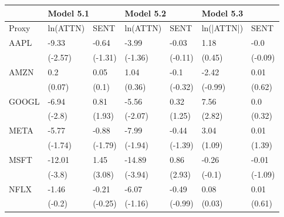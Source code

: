 \begin{tabular}{lllllll}
\toprule
{} & \multicolumn{2}{l}{Model 5.1} & \multicolumn{2}{l}{Model 5.2} & \multicolumn{2}{l}{Model 5.3} \\
\midrule
Proxy &  ln(ATTN) &     SENT &  ln(ATTN) &     SENT &  ln(|ATTN|) &     SENT \\
AAPL  &     -9.33 &    -0.64 &     -3.99 &    -0.03 &        1.18 &     -0.0 \\
      &   (-2.57) &  (-1.31) &   (-1.36) &  (-0.11) &      (0.45) &  (-0.09) \\
AMZN  &       0.2 &     0.05 &      1.04 &     -0.1 &       -2.42 &     0.01 \\
      &    (0.07) &    (0.1) &    (0.36) &  (-0.32) &     (-0.99) &   (0.62) \\
GOOGL &     -6.94 &     0.81 &     -5.56 &     0.32 &        7.56 &      0.0 \\
      &    (-2.8) &   (1.93) &   (-2.07) &   (1.25) &      (2.82) &   (0.32) \\
META  &     -5.77 &    -0.88 &     -7.99 &    -0.44 &        3.04 &     0.01 \\
      &   (-1.74) &  (-1.79) &   (-1.94) &  (-1.39) &      (1.09) &   (1.39) \\
MSFT  &    -12.01 &     1.45 &    -14.89 &     0.86 &       -0.26 &    -0.01 \\
      &    (-3.8) &   (3.08) &   (-3.94) &   (2.93) &      (-0.1) &  (-1.09) \\
NFLX  &     -1.46 &    -0.21 &     -6.07 &    -0.49 &        0.08 &     0.01 \\
      &    (-0.2) &  (-0.25) &   (-1.16) &  (-0.99) &      (0.03) &   (0.61) \\
\bottomrule
\end{tabular}
